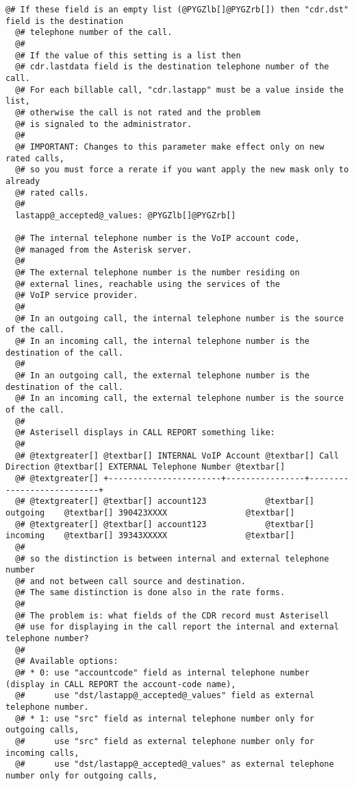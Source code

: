 \documentclass[letterpaper,10pt,english]{sphinxmanual}
\begin{document}
\begin{Verbatim}[commandchars=@\[\]]
  @# If these field is an empty list (@PYGZlb[]@PYGZrb[]) then "cdr.dst" field is the destination
  @# telephone number of the call.
  @#
  @# If the value of this setting is a list then
  @# cdr.lastdata field is the destination telephone number of the call.
  @# For each billable call, "cdr.lastapp" must be a value inside the list, 
  @# otherwise the call is not rated and the problem 
  @# is signaled to the administrator. 
  @# 
  @# IMPORTANT: Changes to this parameter make effect only on new rated calls,
  @# so you must force a rerate if you want apply the new mask only to already
  @# rated calls.
  @# 
  lastapp@_accepted@_values: @PYGZlb[]@PYGZrb[]

  @# The internal telephone number is the VoIP account code,
  @# managed from the Asterisk server.
  @#
  @# The external telephone number is the number residing on 
  @# external lines, reachable using the services of the
  @# VoIP service provider.
  @#
  @# In an outgoing call, the internal telephone number is the source of the call.
  @# In an incoming call, the internal telephone number is the destination of the call.
  @#
  @# In an outgoing call, the external telephone number is the destination of the call.
  @# In an incoming call, the external telephone number is the source of the call.
  @#
  @# Asterisell displays in CALL REPORT something like:
  @#
  @# @textgreater[] @textbar[] INTERNAL VoIP Account @textbar[] Call Direction @textbar[] EXTERNAL Telephone Number @textbar[]
  @# @textgreater[] +-----------------------+----------------+---------------------------+
  @# @textgreater[] @textbar[] account123            @textbar[]    outgoing    @textbar[] 390423XXXX                @textbar[]
  @# @textgreater[] @textbar[] account123            @textbar[]    incoming    @textbar[] 39343XXXXX                @textbar[]
  @#
  @# so the distinction is between internal and external telephone number
  @# and not between call source and destination.
  @# The same distinction is done also in the rate forms.
  @#
  @# The problem is: what fields of the CDR record must Asterisell 
  @# use for displaying in the call report the internal and external telephone number?
  @#
  @# Available options:
  @# * 0: use "accountcode" field as internal telephone number (display in CALL REPORT the account-code name),
  @#      use "dst/lastapp@_accepted@_values" field as external telephone number.
  @# * 1: use "src" field as internal telephone number only for outgoing calls, 
  @#      use "src" field as external telephone number only for incoming calls,
  @#      use "dst/lastapp@_accepted@_values" as external telephone number only for outgoing calls,

\end{Verbatim}
\end{document}
